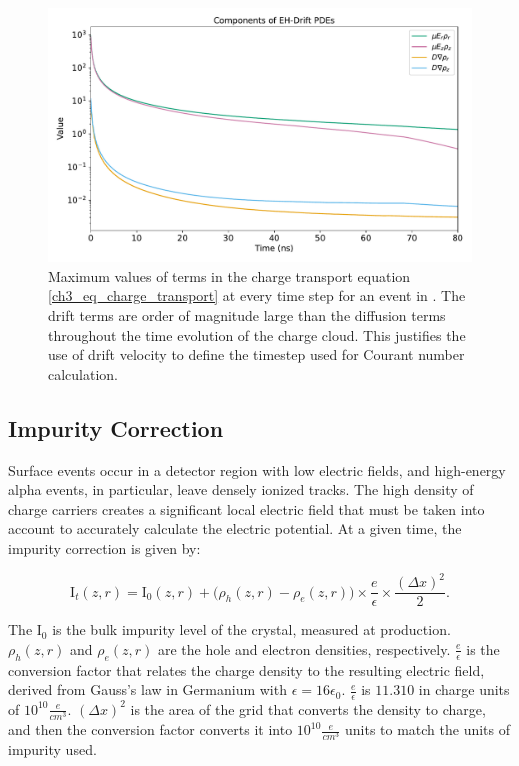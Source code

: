 \begin{figure}%
    \includegraphics[trim={0cm 0 0cm 0},clip,width=0.99\linewidth]{ch3/figs/ehd_pde_comps.pdf}
    \caption{Maximum values of terms in the charge transport equation \ref{ch3_eq_charge_transport} at every time step for an event in {\ehd}. The drift terms are order of magnitude large than the diffusion terms throughout the time evolution of the charge cloud. This justifies the use of drift velocity to define the timestep used for Courant number calculation.}    
    \label{ch3_fig_ehd_pde_comp}
\end{figure}


\subsection{Impurity Correction}
Surface events occur in a detector region with low electric fields, and high-energy alpha events, in particular, leave densely ionized tracks. The high density of charge carriers creates a significant local electric field that must be taken into account to accurately calculate the electric potential. At a given time, the impurity correction is given by:

\begin{equation}
  {\text{I}_{t}}(z, r) = \text{I}_{0}(z, r) +
  \bigl( \rho_h(z, r) - \rho_e(z, r) \bigr) \times \frac{e}{\epsilon} \times \frac{(\Delta x)^2}{2}.
\end{equation}

\noindent
The $\text{I}_{0}$ is the bulk impurity level of the crystal, measured at production. $\rho_h(z,r)$ and $\rho_e(z,r)$ are the hole and electron densities, respectively. $\frac{e}{\epsilon}$ is the conversion factor that relates the charge density to the resulting electric field, derived from Gauss's law in Germanium with $\epsilon = 16\epsilon_0$. $\frac{e}{\epsilon}$ is $11.310$ in
charge units of $10^{10}\frac{e}{cm^3}$. $(\Delta x)^2$ is the area of the grid that converts the density to charge, and then the conversion factor converts it into $10^{10}\frac{e}{cm^3}$ units to match the units of impurity used.

